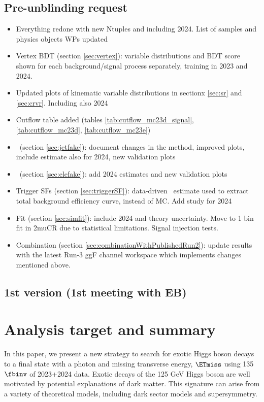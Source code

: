 \subsection{Pre-unblinding request}

\begin{itemize}
	\item Everything redone with new Ntuples and including 2024. List of samples and physics objects WPs updated
	\item Vertex BDT (section \ref{sec:vertex}): variable distributions and BDT score shown for each background/signal process separately, training in 2023 and 2024. 
	\item Updated plots of kinematic variable distributions in sectionx \ref{sec:sr} and \ref{sec:crvr}. Including also 2024
	\item Cutflow table added (tables \ref{tab:cutflow_mc23d_signal}, \ref{tab:cutflow_mc23d}, \ref{tab:cutflow_mc23e})
	\item \jfakey\ (section \ref{sec:jetfake}): document changes in the method, improved plots, include estimate also for 2024, new validation plots
	\item \efakey\ (section \ref{sec:elefake}): add 2024 estimates and new validation plots
	\item Trigger SFs (section \ref{sec:triggerSF}): data-driven \jfakey\ estimate used to extract total background efficiency curve, instead of MC. Add study for 2024
	\item Fit (section \ref{sec:simfit}): include 2024 and theory uncertainty. Move to 1 bin fit in 2muCR due to statistical limitations. Signal injection tests.
	\item Combination (section \ref{sec:combinationWithPublishedRun2}): update results with the latest Run-3 ggF channel workspace which implements changes mentioned above.
\end{itemize} 

\subsection{1st version (1st meeting with EB)}

\section{Analysis target and summary}

In this paper, we present a new strategy to search for exotic Higgs boson decays 
to a final state with a photon and missing transverse energy, $\ETmiss$ using 135$\fbinv$ of 2023+2024 data.
Exotic decays of the 125 GeV Higgs boson are well motivated by potential explanations of dark matter. 
This signature can arise from a variety of theoretical models, including dark sector models and supersymmetry. 

